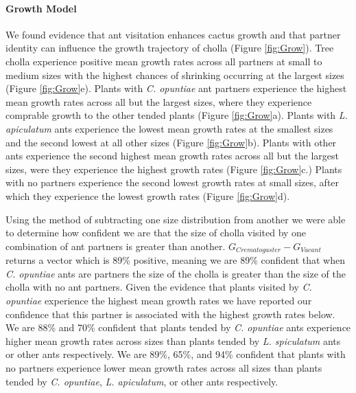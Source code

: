 \documentclass[11pt]{article}
\begin{document}
\paragraph{Growth Model} We found evidence that ant visitation enhances cactus growth and that partner identity can influence the growth trajectory of cholla (Figure \ref{fig:Grow}). 
Tree cholla experience positive mean growth rates across all partners at small to medium sizes with the highest chances of shrinking occurring at the largest sizes (Figure \ref{fig:Grow}e).
Plants with \textit{C. opuntiae} ant partners experience the highest mean growth rates across all but the largest sizes, where they experience comprable growth to the other tended plants (Figure \ref{fig:Grow}a). 
Plants with \textit{L. apiculatum} ants experience the lowest mean growth rates at the smallest sizes and the second lowest at all other sizes (Figure \ref{fig:Grow}b). 
Plants with other ants experience the second highest mean growth rates across all but the largest sizes, were they experience the highest growth rates (Figure \ref{fig:Grow}c.)
Plants with no partners experience the second lowest growth rates at small sizes, after which they experience the lowest growth rates (Figure \ref{fig:Grow}d). 

Using the method of subtracting one size distribution from another we were able to determine how confident we are that the size of cholla visited by one combination of ant partners is greater than another. 
 $G_{Crematogaster} - G_{Vacant}$ returns a vector which is 89\% positive, meaning we are 89\% confident that when \textit{C. opuntiae} ants are partners the size of the cholla is greater than the size of the cholla with no ant partners.
Given the evidence that plants visited by \textit{C. opuntiae} experience the highest mean growth rates we have reported our confidence that this partner is associated with the highest growth rates below. 
We are 88\% and 70\% confident that plants tended by \textit{C. opuntiae} ants experience higher mean growth rates across sizes than plants tended by \textit{L. spiculatum} ants or other ants respectively.
We are 89\%, 65\%, and 94\% confident that plants with no partners experience lower mean growth rates across all sizes than plants tended by \textit{C. opuntiae}, \textit{L. apiculatum}, or other ants respectively.
\end{document}
